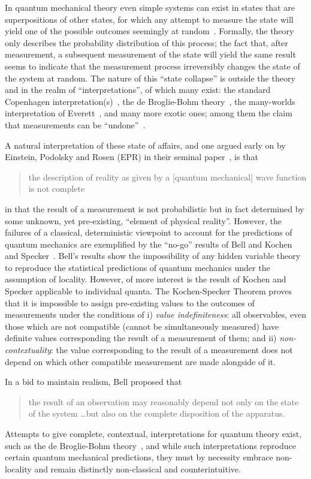 \documentclass{comjnl}
\begin{document}
In quantum mechanical theory even simple systems can exist in states that are superpositions of other states, for which any attempt to measure the state will yield one of the possible outcomes seemingly at random~\cite{zeil-99}.
Formally, the theory only describes the probability distribution of this process;
the fact that, after measurement, a subsequent measurement of the state will yield the same result seems to indicate that the measurement process irreversibly changes the state of the system at random.
The nature of this ``state collapse'' is outside the theory and in the realm of ``interpretations'', of which many exist:
the standard Copenhagen interpretation(s)~\cite{wheeler-Zurek:83}, the de Broglie-Bohm theory~\cite{bohm52}, the many-worlds interpretation of Everett~\cite{everett}, and many more exotic ones; among them
the claim that measurements can be ``undone''~\cite{PhysRevD.22.879,PhysRevA.25.2208,greenberger2,Nature351,Zajonc-91,PhysRevA.45.7729,PhysRevLett.73.1223,PhysRevLett.75.3783,hkwz}.

A natural interpretation of these state of affairs, and one argued early on by Einstein, Podolsky and Rosen (EPR) in their seminal paper~\cite{epr}, is that
\begin{quote}
	the description of reality as given by a [quantum mechanical] wave function is not complete
\end{quote}
in that the result of a measurement is not probabilistic but in fact determined by some unknown, yet pre-existing, ``element of physical reality''.
However, the failures of a classical, deterministic viewpoint to account for the predictions of quantum mechanics are exemplified by the ``no-go'' results of Bell \cite{bell} and Kochen and Specker~\cite{kochen1}.
Bell's results show the impossibility of any hidden variable theory to reproduce the statistical predictions of quantum mechanics under the assumption of locality.
However, of more interest  is the result of Kochen and Specker applicable to individual quanta.
The Kochen-Specker Theorem proves that it is impossible to assign pre-existing values to the outcomes of measurements under the conditions of i)  \emph{value indefiniteness}: all observables, even those which are not compatible (cannot be simultaneously measured) have definite values corresponding the result of a measurement of them; and  ii) \emph{non-contextuality}: the value corresponding to the result of a measurement does not depend on which other compatible measurement are made alongside of it.

In a  bid to maintain realism, Bell proposed that~\cite{bell-66}
\begin{quote}
	the result of an observation may reasonably depend not only on the state of the system \dots but also on the complete disposition of the apparatus.
\end{quote}
Attempts to give complete, contextual, interpretations for quantum theory exist, such as the de Broglie-Bohm theory~\cite{bohm52}, and while such interpretations reproduce certain quantum mechanical predictions, they must by necessity embrace non-locality and remain distinctly non-classical and counterintuitive.
\end{document}
